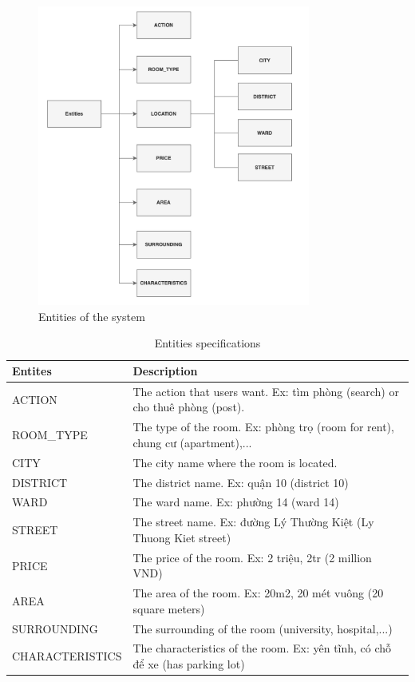 \begin{figure}[ht]
    \centering
    \includegraphics[width=0.8\textwidth]{../Images/7.System_Modeling/entities.png}
    \caption{Entities of the system}
    \label{fig:entities}
\end{figure}

{\renewcommand{\arraystretch}{1.75}%
\begin{table}[ht]
    \centering
    \begin{tabular}{|l|l|}
        \hline
        \textbf{Entites} & \textbf{Description} \\ \hline
        ACTION & The action that users want. Ex: tìm phòng (search) or cho thuê phòng (post). \\ \hline
        ROOM\_TYPE & The type of the room. Ex: phòng trọ (room for rent), chung cư (apartment),... \\ \hline
        CITY & The city name where the room is located. \\ \hline
        DISTRICT & The district name. Ex: quận 10 (district 10) \\ \hline
        WARD & The ward name. Ex: phường 14 (ward 14) \\ \hline
        STREET & The street name. Ex: đường Lý Thường Kiệt (Ly Thuong Kiet street)\\ \hline
        PRICE & The price of the room. Ex: 2 triệu, 2tr (2 million VND) \\ \hline
        AREA & The area of the room. Ex: 20m2, 20 mét vuông (20 square meters) \\ \hline
        SURROUNDING & The surrounding of the room (university, hospital,...)\\ \hline
        CHARACTERISTICS & The characteristics of the room. Ex: yên tĩnh, có chỗ để xe (has parking lot) \\ \hline

    \end{tabular}
    \caption{Entities specifications}
    \label{tab:entities-specifications}
\end{table}}
\clearpage

